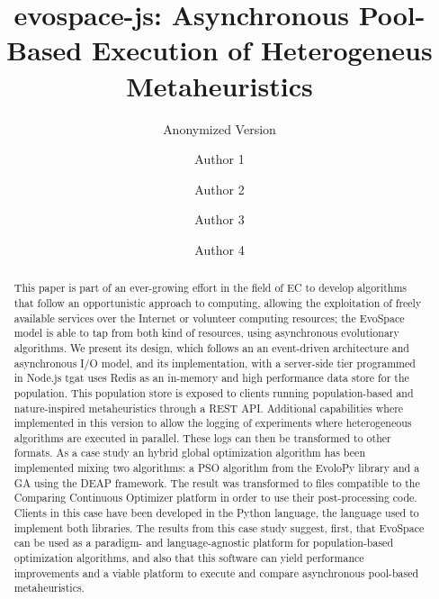 \documentclass[sigconf]{acmart}
\begin{document}
\title{evospace-js: Asynchronous Pool-Based Execution of Heterogeneus Metaheuristics}
\subtitle{Anonymized Version}


\author{Author 1}

\author{Author 2}

\author{Author 3}

\author{Author 4}



\begin{abstract}

This paper is part of an ever-growing effort in the field of EC to
develop algorithms that follow an opportunistic approach to computing, allowing the exploitation
of freely available services over the Internet or volunteer computing
resources; the EvoSpace model is able to tap from both kind of
resources, using asynchronous evolutionary algorithms. We present its
design, which follows an an event-driven 
architecture and asynchronous I/O model, and its implementation, with
a server-side tier programmed in Node.js tgat uses Redis as an
in-memory and high performance data store for the population. This
population store is exposed to clients running population-based and nature-inspired metaheuristics
through a REST API. Additional capabilities where implemented in this version to
allow the logging of experiments where heterogeneous algorithms are executed in parallel.
These logs can then be transformed to other formats. As a case study
an hybrid global optimization algorithm has been implemented mixing
two algorithms: a PSO algorithm from the EvoloPy library and a GA using the DEAP framework.
The result was transformed to files compatible to the Comparing Continuous Optimizer platform
in order to use their post-processing code. Clients in this case have been developed in 
the Python language, the language used to implement both
libraries. The results from this case study suggest, first, that
EvoSpace can be used as a paradigm- and language-agnostic platform for
population-based optimization algorithms, and also that this software can yield
performance improvements and a viable platform to execute and compare asynchronous pool-based
metaheuristics.   
\end{abstract}
\end{document}
